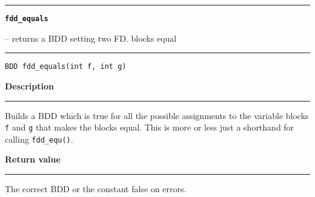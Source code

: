 \begin{minipage}{\textwidth}

\noindent\begin{minipage}{\textwidth}
\rule{\textwidth}{0.5mm}
{\tt\bf fdd\_equals }
\--- returns a BDD setting two FD. blocks equal  \hspace{\fill}
\\\rule[1.5ex]{\textwidth}{0.5mm}
\end{minipage}

\noindent\begin{verbatim}
BDD fdd_equals(int f, int g) 
\end{verbatim}

\vspace{\parsep}\noindent
{\bf Description}\\\rule[1.5ex]{\textwidth}{0.2mm}\vspace{-1.5ex}\setlength{\parindent}{1em}
Builds a BDD which is true for all the possible assignments to
           the variable blocks {\tt f} and {\tt g} that makes the blocks
	   equal. This is more or less just a shorthand for calling
	   {\tt fdd\_equ()}. 

\setlength{\parindent}{0em}\vspace{\parsep}\vspace{\baselineskip}\noindent
{\bf Return value}\\\rule[1.5ex]{\textwidth}{0.2mm}\vspace{-1.5ex}
The correct BDD or the constant false on errors. 
\end{minipage}
\vspace{8ex}
